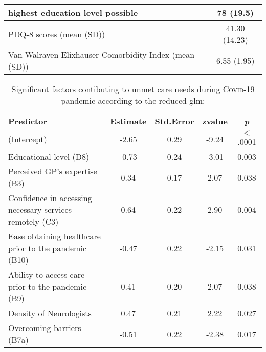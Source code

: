 \documentclass{bmcart}
\begin{document}
\begin{backmatter}
\begin{table}[H]
\begin{tabular}{p{5cm} c}
\hspace{3mm} highest education level possible & 78 (19.5)  \\ \hline
\hspace{3mm} PDQ-8 scores (mean (SD)) & 41.30 (14.23) \\ \hline
Van-Walraven-Elixhauser \newline \hspace{3mm} Comorbidity Index (mean (SD)) & 6.55 (1.95) \\ 
\bottomrule
\end{tabular}
\end{table}

\begin{table}[H]
\caption{Significant factors contibuting to unmet care needs during \textsc{Covid}-19 pandemic according to the reduced \ac{glm}:}
\label{tab2:reduced_model}
\centering
\begin{tabular}{l c c c c}
\toprule    
Predictor 												& Estimate 	& Std.Error & zvalue & \textit{p} \\
\midrule
(Intercept) 											& -2.65  		& 0.29 	& -9.24 	& $<$.0001 \\ \hline
Educational level (D8) 									& -0.73 		& 0.24 	& -3.01 	& 0.003 \\ \hline
Perceived GP's expertise (B3) 							& 0.34 		& 0.17 	& 2.07 	& 0.038 \\ \hline
Confidence in accessing necessary services remotely (C3) 	& 0.64 		& 0.22 	& 2.90 	& 0.004 \\ \hline
Ease obtaining healthcare prior to the pandemic (B10)		& -0.47 		& 0.22 	& -2.15 	& 0.031 \\ \hline
Ability to access care prior to the pandemic (B9)				& 0.41 		& 0.20 	& 2.07 	& 0.038 \\ \hline
Density of Neurologists 									& 0.47 		& 0.21 	& 2.22 	& 0.027 \\ \hline
Overcoming barriers (B7a)   								& -0.51 		& 0.22 	& -2.38 	& 0.017 \\
\bottomrule
\end{tabular}
\end{table}	



\newpage

\end{backmatter}
\end{document}
